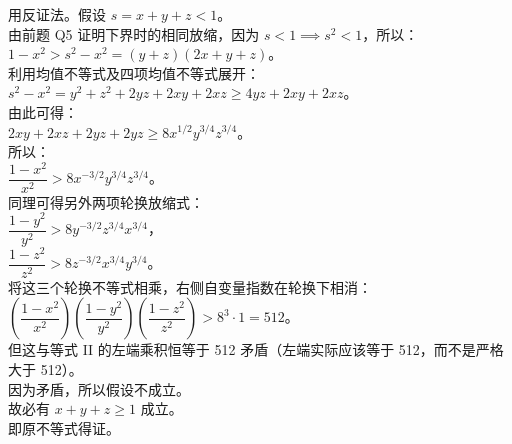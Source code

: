 {  用反证法。假设 \(s = x + y + z < 1\)。\\
  由前题 Q5 证明下界时的相同放缩，因为 \(s < 1 \implies s^2 < 1\)，所以：\\
  \(1 - x^2 > s^2 - x^2 = (y + z)(2x + y + z)\)。\\
  利用均值不等式及四项均值不等式展开：\\
  \(s^2 - x^2 = y^2 + z^2 + 2yz + 2xy + 2xz \geqslant 4yz + 2xy + 2xz\)。\\
  由此可得：\\
  \(2xy + 2xz + 2yz + 2yz \geqslant 8x^{1/2}y^{3/4}z^{3/4}\)。\\
  所以：\\
  \(\dfrac{1 - x^2}{x^2} > 8x^{-3/2}y^{3/4}z^{3/4}\)。\\
  同理可得另外两项轮换放缩式：\\
  \(\dfrac{1 - y^2}{y^2} > 8y^{-3/2}z^{3/4}x^{3/4}\)，\\
  \(\dfrac{1 - z^2}{z^2} > 8z^{-3/2}x^{3/4}y^{3/4}\)。\\
  将这三个轮换不等式相乘，右侧自变量指数在轮换下相消：\\
  \(\left(\dfrac{1 - x^2}{x^2}\right)\left(\dfrac{1 - y^2}{y^2}\right)\left(\dfrac{1 - z^2}{z^2}\right) > 8^3 \cdot 1 = 512\)。\\
  但这与等式 II 的左端乘积恒等于 512 矛盾（左端实际应该等于 512，而不是严格大于 512）。\\
  因为矛盾，所以假设不成立。\\
  故必有 \(x + y + z \geqslant 1\) 成立。\\
  即原不等式得证。%
}

